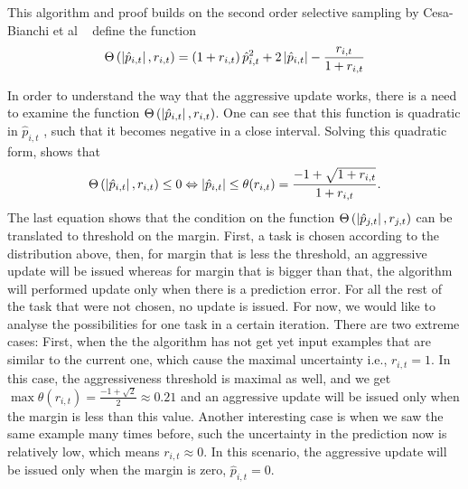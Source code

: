 This algorithm and proof builds on the second order selective sampling by Cesa-Bianchi 
et al ~\cite{cesa2006worst} define the function
\begin{equation}
\Theta\left({\left\vert{\hat{p}_{i,t}}\right\vert,r_{i,t}}\right)=\left({1+r_{i,t}}\right)\hat{p}_{i,t}^2+2\left\vert{\hat{p}_{i,t}}\right\vert-\frac{r_{i,t}}{1+r_{i,t}}
\end{equation}

In order to understand the way that the aggressive update works, there is a need to examine the function $\Theta\left({\left\vert{\hat{p}_{i,t}}\right\vert,r_{i,t}}\right)$. One can see that this function is quadratic in $\hat{p}_{i,t}$ , such that it becomes negative in a close interval. Solving this quadratic form, shows that 
\begin{equation}
\Theta\left({\left\vert{\hat{p}_{i,t}}\right\vert,r_{i,t}}\right)\le0 \Leftrightarrow \left\vert{\hat{p}_{i,t}}\right\vert\le\theta({r_{i,t}})=\frac{-1+\sqrt{1+r_{i,t}}}{1+r_{i,t}}.
\end{equation}
The last equation shows that the condition on the function $\Theta\left({\left\vert{\hat{p}_{j,t}}\right\vert,r_{j,t}}\right)$ 
can be translated to threshold on the margin. First, a task is chosen according to the distribution above, 
then, for margin that is less the threshold, an aggressive update will be issued whereas for margin that is 
bigger than that, the algorithm will performed update only when there is a prediction error. For 
all the rest of the task that were not chosen, no update is issued. For now, we would like to analyse the 
possibilities for one task in a certain iteration. There are two extreme cases: First, when the the algorithm 
has not get yet input examples that are similar to the current one, which cause the maximal uncertainty 
i.e., $r_{i,t}=1$. In this case,  the aggressiveness threshold is maximal as well, and we get 
$\max{\theta({r_{i,t}})}=\frac{-1+\sqrt{2}}{2}\approx0.21$ and an aggressive update will be issued only 
when the margin is less than this value. Another interesting case is when we saw the same example many 
times before, such the uncertainty in the prediction now is relatively low, which means $r_{i,t}\approx0$. 
In this scenario, the aggressive update will be issued only when the margin is zero, $\hat{p}_{i,t}=0$. 
\\

